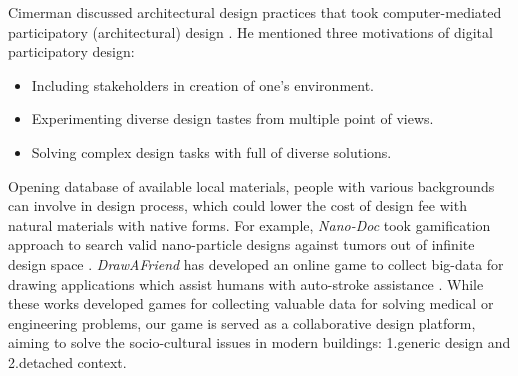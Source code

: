 Cimerman discussed architectural design practices that took computer-mediated participatory (architectural) design \cite{cimerman2000participatory}.
He mentioned three motivations of digital participatory design:
\begin{itemize}
 \item{Including stakeholders in creation of one's environment.}
 \item{Experimenting diverse design tastes from multiple point of views.}
 \item{Solving complex design tasks with full of diverse solutions.}
\end{itemize}

Opening database of available local materials, people with various backgrounds can involve in design process, which could lower the cost of design fee with natural materials with native forms.
For example, \textit{Nano-Doc} took gamification approach to search valid nano-particle designs against tumors out of infinite design space \cite{hauertcrowdsourcing}.
\textit{DrawAFriend} has developed an online game to collect big-data for drawing applications which assist humans with auto-stroke assistance \cite{limpaecher2013real}.
While these works developed games for collecting valuable data for solving medical or engineering problems, our game is served as a collaborative design platform, aiming to solve the socio-cultural issues in modern buildings: 1.generic design and 2.detached context.
